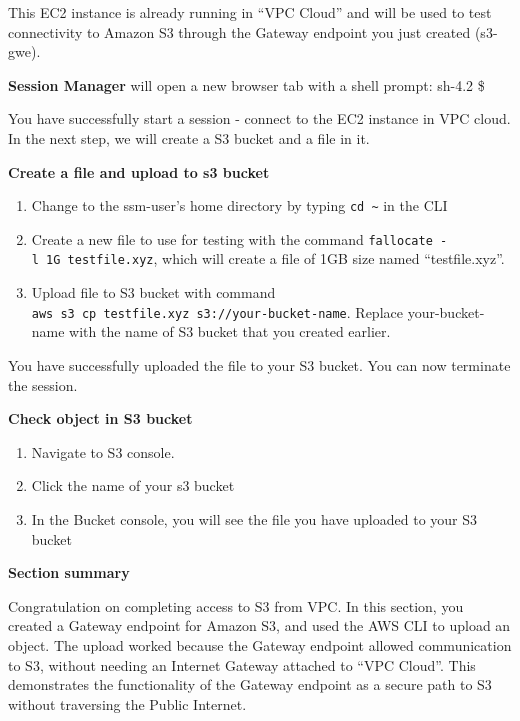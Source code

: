 This EC2 instance is already running in ``VPC Cloud'' and will be used
to test connectivity to Amazon S3 through the Gateway endpoint you just
created (s3-gwe).

\textbf{Session Manager} will open a new browser tab with a shell
prompt: sh-4.2 \$

You have successfully start a session - connect to the EC2 instance in
VPC cloud. In the next step, we will create a S3 bucket and a file in
it.

\vspace{0.5em}\noindent\textbf{Create a file and upload to s3
bucket}\par

\begin{enumerate}
\def\labelenumi{\arabic{enumi}.}
\item
  Change to the ssm-user's home directory by typing
  \texttt{cd\ \textasciitilde{}} in the CLI
\item
  Create a new file to use for testing with the command
  \texttt{fallocate\ -l\ 1G\ testfile.\allowbreak{}xyz}, which will create a file of
  1GB size named ``testfile.xyz''.
\item
  Upload file to S3 bucket with command
  \texttt{aws\ s3\ cp\ testfile.\allowbreak{}xyz\ s3:/\allowbreak{}/\allowbreak{}your-\allowbreak{}bucket-\allowbreak{}name}. Replace
  your-bucket-name with the name of S3 bucket that you created earlier.
\end{enumerate}

You have successfully uploaded the file to your S3 bucket. You can now
terminate the session.

\vspace{0.5em}\noindent\textbf{Check object in S3 bucket}\par

\begin{enumerate}
\def\labelenumi{\arabic{enumi}.}
\tightlist
\item
  Navigate to S3 console.\\
\item
  Click the name of your s3 bucket
\item
  In the Bucket console, you will see the file you have uploaded to your
  S3 bucket
\end{enumerate}

\vspace{0.5em}\noindent\textbf{Section summary}\par

Congratulation on completing access to S3 from VPC. In this section, you
created a Gateway endpoint for Amazon S3, and used the AWS CLI to upload
an object. The upload worked because the Gateway endpoint allowed
communication to S3, without needing an Internet Gateway attached to
``VPC Cloud''. This demonstrates the functionality of the Gateway
endpoint as a secure path to S3 without traversing the Public Internet.
